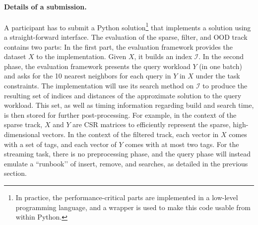 \paragraph{Details of a submission.} A participant has to submit a Python solution\footnote{In practice, the performance-critical parts are implemented in a low-level programming language, and a wrapper is used to make this code usable from within Python.} that implements a solution using a straight-forward interface. The evaluation of the sparse, filter, and OOD track contains two parts: In the first part, the evaluation framework provides the dataset $X$ to the implementation. Given $X$, it builds an index $\mathcal{I}$. In the second phase, the evaluation framework presents the query workload $Y$ (in one batch) and asks for the 10 nearest neighbors for each query in $Y$ in $X$ under the task constraints. The implementation will use its search method on $\mathcal{I}$ to produce the resulting set of indices and distances of the approximate solution to the query workload. This set, as well as timing information regarding build and search time, is then stored for further post-processing. For example, in the context of the sparse track, $X$ and $Y$ are CSR matrices to efficiently represent the sparse, high-dimensional vectors. In the context of the filtered track, each vector in $X$ comes with a set of tags, and each vector of $Y$ comes with at most two tags. For the streaming task, there is no preprocessing phase, and the query phase will instead emulate a ``runbook’’ of insert, remove, and searches, as detailed in the previous section.
